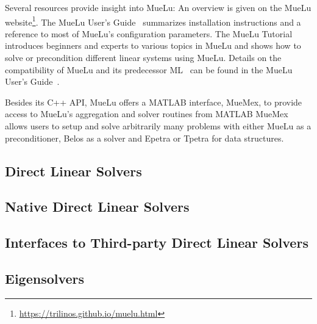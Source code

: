 Several resources provide insight into MueLu:
An overview is given on the MueLu website\footnote{\url{https://trilinos.github.io/muelu.html}}.
The MueLu User's Guide~\cite{BergerVergiat2023a} summarizes installation instructions and a reference to most of MueLu's configuration parameters.
The MueLu Tutorial~\cite{Mayr2023b} introduces beginners and experts to various topics in MueLu and shows how to solve or precondition different linear systems using MueLu.
Details on the compatibility of MueLu and its predecessor ML~\cite{Heroux2005a,Gee2006a} can be found in the MueLu User's Guide~\cite{BergerVergiat2023a}.

Besides its C++ API, MueLu offers a MATLAB interface, MueMex, to provide access to MueLu's aggregation and solver routines from MATLAB
MueMex allows users to setup and solve arbitrarily many problems with either MueLu as a preconditioner, Belos as a solver and Epetra or Tpetra for data structures.



\subsection{Direct Linear Solvers}

\subsection{Native Direct Linear Solvers}

\subsection{Interfaces to Third-party Direct Linear Solvers}

\subsection{Eigensolvers}

